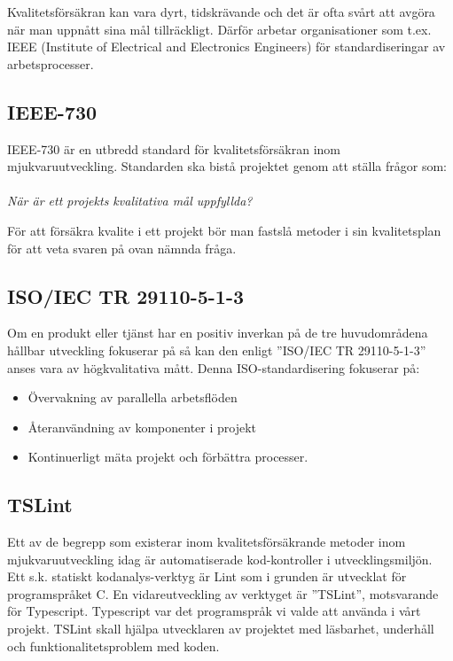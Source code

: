 Kvalitetsförsäkran kan vara dyrt, tidskrävande och det är ofta svårt att avgöra när man uppnått sina mål tillräckligt\cite{lighthouse}.
Därför arbetar organisationer som t.ex. IEEE (Institute of Electrical and Electronics Engineers) för standardiseringar av arbetsprocesser.



\subsection{IEEE-730}

IEEE-730 är en utbredd standard för kvalitetsförsäkran inom mjukvaruutveckling. Standarden ska bistå projektet genom att ställa frågor som:
\\ \\
\emph{När är ett projekts kvalitativa mål uppfyllda?}

För att försäkra kvalite i ett projekt bör man fastslå metoder i sin kvalitetsplan för att veta svaren på ovan nämnda fråga. \\


\subsection{ISO/IEC TR 29110-5-1-3}
Om en produkt eller tjänst har en positiv inverkan på de tre huvudområdena hållbar utveckling fokuserar på så kan den enligt ”ISO/IEC TR 29110-5-1-3” \cite{ISOtor} anses vara av högkvalitativa mått. Denna ISO-standardisering fokuserar på: 

\begin{itemize}
	\item Övervakning av parallella arbetsflöden
	\item Återanvändning av komponenter i projekt
	\item Kontinuerligt mäta projekt och förbättra processer.
\end{itemize}


\subsection{TSLint}
Ett av de begrepp som existerar inom kvalitetsförsäkrande metoder inom mjukvaruutveckling idag är automatiserade kod-kontroller i utvecklingsmiljön.
Ett s.k. statiskt kodanalys-verktyg är Lint som i grunden är utvecklat för programspråket C. En vidareutveckling av verktyget är ”TSLint”, motsvarande för Typescript. Typescript var det programspråk vi valde att använda i vårt projekt. TSLint skall hjälpa utvecklaren av projektet med läsbarhet, underhåll och funktionalitetsproblem med koden.

